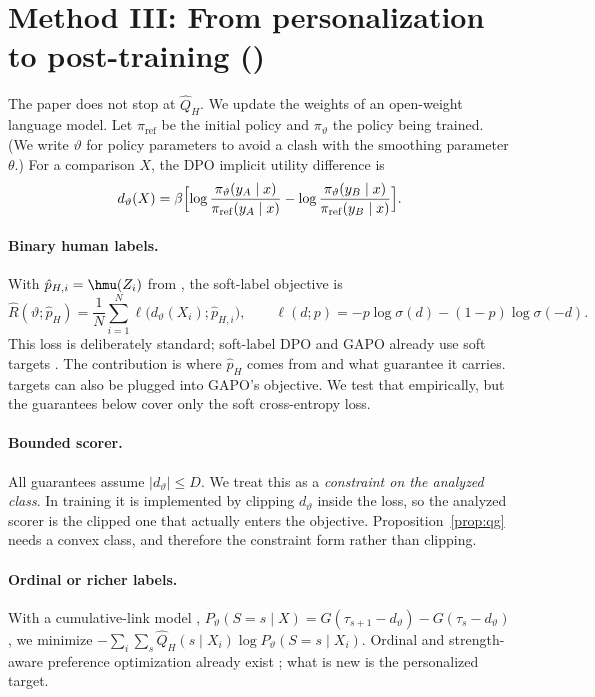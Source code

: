 \section{Method III: From personalization to post-training (\fsppo)}
\label{sec:post-training}

The paper does not stop at $\widehat Q_H$. We update the weights of an open-weight language model.
Let $\pi_{\mathrm{ref}}$ be the initial policy and $\pi_\vartheta$ the policy being trained. (We write
$\vartheta$ for policy parameters to avoid a clash with the smoothing parameter $\theta$.) For a
comparison $X$, the DPO implicit utility difference \citep{rafailov2023dpo} is
\[
  d_\vartheta(X)=\beta\Bigl[\log\frac{\pi_\vartheta(y_A\mid x)}{\pi_{\mathrm{ref}}(y_A\mid x)}
  -\log\frac{\pi_\vartheta(y_B\mid x)}{\pi_{\mathrm{ref}}(y_B\mid x)}\Bigr].
\]

\paragraph{Binary human labels.}
With $\hat p_{H,i}=\hmu(Z_i)$ from \dfsp{}, the soft-label objective is
\[
  \widehat R(\vartheta;\hat p_H)=\frac1N\sum_{i=1}^{N}\ell\bigl(d_\vartheta(X_i);\hat p_{H,i}\bigr),\qquad
  \ell(d;p)=-p\log\sigma(d)-(1-p)\log\sigma(-d).
\]
This loss is deliberately standard; soft-label DPO and GAPO already use soft targets
\citep{lee2024rlaif,furuta2024gapo}. The contribution is where $\hat p_H$ comes from and what
guarantee it carries. \dfsp{} targets can also be plugged into GAPO's objective. We test that
empirically, but the guarantees below cover only the soft cross-entropy loss.

\paragraph{Bounded scorer.}
All guarantees assume $|d_\vartheta|\le D$. We treat this as a \emph{constraint on the analyzed
class}. In training it is implemented by clipping $d_\vartheta$ inside the loss, so the analyzed
scorer is the clipped one that actually enters the objective. Proposition~\ref{prop:qg} needs a
convex class, and therefore the constraint form rather than clipping.

\paragraph{Ordinal or richer labels.}
With a cumulative-link model \citep{mccullagh1980regression},
$P_\vartheta(S=s\mid X)=G(\tau_{s+1}-d_\vartheta)-G(\tau_s-d_\vartheta)$, we minimize
$-\sum_i\sum_s\widehat Q_H(s\mid X_i)\log P_\vartheta(S=s\mid X_i)$. Ordinal and strength-aware
preference optimization already exist \citep{imai2026mixdpo}; what is new is the personalized target.

